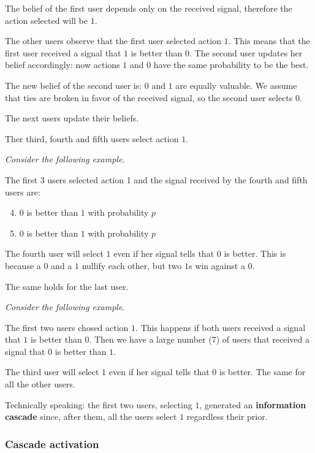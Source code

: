 \documentclass[10pt,a4paper]{article}
\begin{document}
The belief of the first user depends only on the received signal, therefore the action selected will be $1$.

The other users observe that the first user selected action $1$. This means that the first user received a signal that $1$ is better than $0$. The second user updates her belief accordingly: now actions $1$ and $0$ have the same probability to be the best.

The new belief of the second user is: $0$ and $1$ are equally valuable. We assume that ties are broken in favor of the received signal, so the second user selects $0$.

The next users update their beliefs.

Ther third, fourth and fifth users select action $1$.

\textit{Consider the following example.}

The first 3 users selected action 1 and the signal received by the fourth and fifth users are:

\begin{enumerate}
\setcounter{enumi}{3}
\item $0$ is better than $1$ with probability $p$
\item $0$ is better than $1$ with probability $p$
\end{enumerate}

The fourth user will select $1$ even if her signal tells that $0$ is better. This is because a $0$ and a $1$ nullify each other, but two $1$s win against a $0$.

The same holds for the last user.

\textit{Consider the following example}.

The first two users chosed action $1$. This happens if both users received a signal that $1$ is better than $0$. Then we have a large number (7) of users that received a signal that $0$ is better than $1$.

The third user will select $1$ even if her signal tells that $0$ is better. The same for all the other users.

Technically speaking: the first two users, selecting $1$, generated an \textbf{information cascade} since, after them, all the users select $1$ regardless their prior.

\subsubsection{Cascade activation}\label{cascade-activation}
\end{document}
